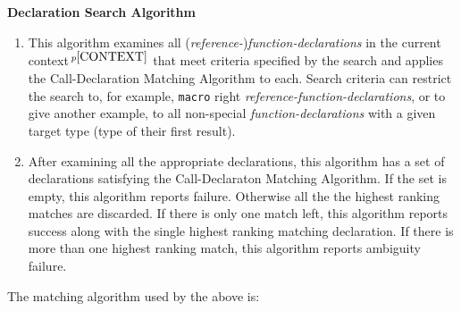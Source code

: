 \documentclass[12pt]{article}
\newcommand{\pagnote}[1]{$\,^{p\pageref{#1}}$}
\begin{document}
\bigskip

\centerline{\bf Declaration Search Algorithm}
\begin{enumerate}
\item This algorithm examines all ({\em reference-}){\em function-declarations}
in the current context\pagnote{CONTEXT} that meet criteria specified by the
search and applies the Call-Declaration Matching Algorithm to each.
Search criteria can restrict the search to, for example, {\tt macro}
right {\em reference-function-declarations}, or to give another example,
to all non-special {\em function-declarations} with a given target type
(type of their first result).
\item
After examining all the appropriate declarations, this algorithm has
a set of declarations satisfying the Call-Declaraton Matching Algorithm.
If the set is empty, this algorithm reports failure.  Otherwise all the
the highest ranking matches are discarded.  If there is only one match
left, this algorithm reports success along with the single highest
ranking matching declaration.
If there is more than one highest ranking match, this algorithm reports
ambiguity failure.

\end{enumerate}

The matching algorithm used by the above is:

\bigskip
\end{document}
